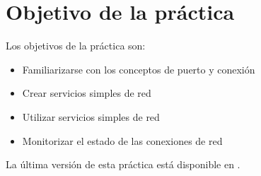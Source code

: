 
\usepackage{eurosym}


\renewcommand{\hmwkClass}{Planificación y Administración de Redes}
\renewcommand{\hmwkTitle}{Práctica de conexiones TCP}









\primerapagina

\setlength{\parindent}{0em}
\setlength{\parskip}{1em}


\section{Objetivo de la práctica}
Los objetivos  de la práctica son:
\begin{itemize}
\item Familiarizarse con los conceptos de puerto y conexión
\item Crear servicios simples de red
\item Utilizar servicios simples de red
\item Monitorizar el estado de las conexiones de red
\end{itemize}


La última versión de esta práctica está disponible en .



